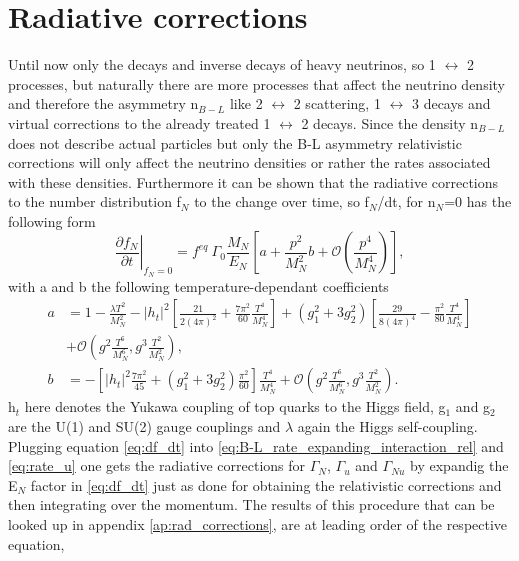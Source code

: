 \section{Radiative corrections}
Until now only the decays and inverse decays of heavy neutrinos, so 1 $\leftrightarrow$ 2 processes, but naturally there are more processes that affect the neutrino density and therefore the asymmetry n$_{B-L}$ like 2 $\leftrightarrow$ 2 scattering, 1 $\leftrightarrow$ 3 decays and virtual corrections to the already treated 1 $\leftrightarrow$ 2 decays. \newline
Since the density n$_{B-L}$ does not describe actual particles but only the B-L asymmetry relativistic corrections will only affect the neutrino densities or rather the rates associated with these densities. Furthermore it can be shown that the radiative corrections to the number distribution f$_N$ to the change over time, so f$_N$/dt, for n$_N$=0 has the following form \cite{Laine:2011pq}
\begin{equation}
\left.\frac{\partial f_N}{\partial t}\right|_{f_N=0}=f^{eq}\:\Gamma_0\frac{M_N}{E_N}\left[a+\frac{p^2}{M_N^2}b+\mathcal{O}\left(\frac{p^4}{M_N^4}\right)\right],
\label{eq:df_dt}
\end{equation}
with a and b the following temperature-dependant coefficients
\begin{align}
a&=1-\frac{\lambda T^2}{M_N^2}-\left|h_t\right|^2\left[\frac{21}{2(4\pi)^2}+\frac{7\pi^2}{60}\frac{T^4}{M_N^4}\right]+\left(g_1^2+3g_2^2\right)\left[\frac{29}{8\left(4\pi\right)^4}-\frac{\pi^2}{80}\frac{T^4}{M_N^4}\right]\\
\nonumber
&+\mathcal{O}\left(g^2\frac{T^6}{M_N^6},g^3\frac{T^2}{M_N^2}\right),\\
b&=-\left[\left|h_t\right|^2\frac{7\pi^2}{45}+\left(g_1^2+3g_2^2\right)\frac{\pi^2}{60}\right]\frac{T^4}{M_N^4}+\mathcal{O}\left(g^2\frac{T^6}{M_N^6},g^3\frac{T^2}{M_N^2}\right).
\end{align}
h$_t$ here denotes the Yukawa coupling of top quarks to the Higgs field, g$_1$ and g$_2$ are the U(1) and SU(2) gauge couplings and $\lambda$ again the Higgs self-coupling. \newline
Plugging equation \eqref{eq:df_dt} into \eqref{eq:B-L_rate_expanding_interaction_rel} and \eqref{eq:rate_u} one gets the radiative corrections for $\Gamma_N$, $\Gamma_u$ and $\Gamma_{Nu}$ by expandig the E$_N$ factor in \eqref{eq:df_dt} just as done for obtaining the relativistic corrections and then integrating over the momentum. The results of this procedure that can be looked up in appendix \ref{ap:rad_corrections}, are at leading order of the respective equation,
